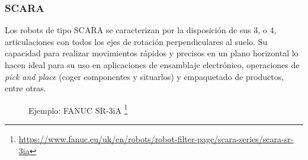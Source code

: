 \subsubsection{SCARA}
\label{sec:scara}
Los robots de tipo \acs{SCARA} se caracterizan por la disposición de sus 3, o 4, articulaciones con todos los ejes de rotación perpendiculares al suelo. Su capacidad para 
realizar movimientos rápidos y precisos en un plano horizontal lo hacen ideal para su uso en aplicaciones de ensamblaje electrónico, operaciones de 
\textit{pick and place} (coger componentes y situarlos) y empaquetado de productos, entre otras.
\begin{figure} [h!]
  \centering    
  \hspace{3cm}
  \caption[Fanuc SR-3iA]{Ejemplo: FANUC SR-3iA \footnote{\url{https://www.fanuc.eu/uk/en/robots/robot-filter-page/scara-series/scara-sr-3ia}}}
\end{figure}
\newpage
